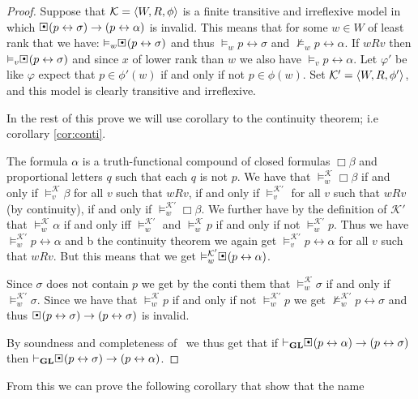 \documentclass[../main.tex]{subfiles}
\begin{document}
\begin{proof}
	Suppose that $\mathcal{K}=\langle W,R,\phi\rangle$ is a finite transitive and irreflexive model
	in which
	$\sBox(p\leftrightarrow\sigma)\rightarrow(p\leftrightarrow\alpha)$ is
	invalid. This means that for some $w\in W$ of least rank that we have:
	$\vDash_w\sBox(p\leftrightarrow\sigma)$ and thus $\vDash_w
	p\leftrightarrow\sigma$ and $\not\vDash_w p\leftrightarrow\alpha$. If $wRv$
	then $\vDash_v\sBox(p\leftrightarrow\sigma)$ and since $x$ of lower
	rank than $w$ we also have $\vDash_v p\leftrightarrow\alpha$. Let
	$\varphi'$ be like $\varphi$ expect that $p\in\phi'(w)$ if and only if
	not $p\in\phi(w)$. Set $\mathcal{K}'=\langle W,R,\phi'\rangle$, and this model
	is clearly transitive and irreflexive.

	In the rest of this prove we will use corollary to the continuity
	theorem; i.e corollary \ref{cor:conti}.


	The formula $\alpha$ is a truth-functional compound  of closed formulas $\Box\beta$ and proportional letters $q$
	such that each $q$ is not $p$. We have that
	$\vDash_w^\mathcal{K}\Box\beta$ if and only if
	$\vDash_v^\mathcal{K}\beta$ for all $v$ such that $wRv$, if and only if
	$\vDash_v^{\mathcal{K}'}$ for all $v$ such that $wRv$ (by continuity),
	if and only if $\vDash_w^{\mathcal{K}'}\Box\beta$. We further have by
	the definition of $\mathcal{K}'$ that $\vDash_w^\mathcal{K}\alpha$ if
	and only iff $\vDash_w^{\mathcal{K}'}$ and $\vDash_w^\mathcal{K}p$ if
	and only if not $\vDash_w^{\mathcal{K}'}p$. Thus we have
	$\vDash_w^{\mathcal{K}'}p\leftrightarrow\alpha$ and b the continuity  theorem
	we again get $\vDash_v^{\mathcal{K}'}p\leftrightarrow\alpha$ for all
	$v$ such that $wRv$. But this means that we get
	$\vDash_w^{\mathcal{K}'}\sBox(p\leftrightarrow\alpha)$.
	
	Since $\sigma$ does not contain $p$ we get by the conti them that
	$\vDash_w^\mathcal{K}\sigma$ if and only if
	$\vDash_w^{\mathcal{K}'}\sigma$. Since we have that
	$\vDash_w^\mathcal{K} p$ if and only if not $\vDash_w^{\mathcal{K}'}p$
	we get $\not\vDash_w^{\mathcal{K}'}p\leftrightarrow \sigma$ and thus
	$\sBox(p\leftrightarrow\sigma)\rightarrow(p\leftrightarrow\sigma)$ is
	invalid.

	By soundness and completeness of \GL\ we thus get that if
	$\vdash_\GL\sBox(p\leftrightarrow\alpha)\rightarrow(p\leftrightarrow\sigma)$
	then
	$\vdash_\GL\sBox(p\leftrightarrow\sigma)\rightarrow(p\leftrightarrow\alpha)$.
\end{proof}
From this we can prove the following corollary that show that the name
\end{document}
